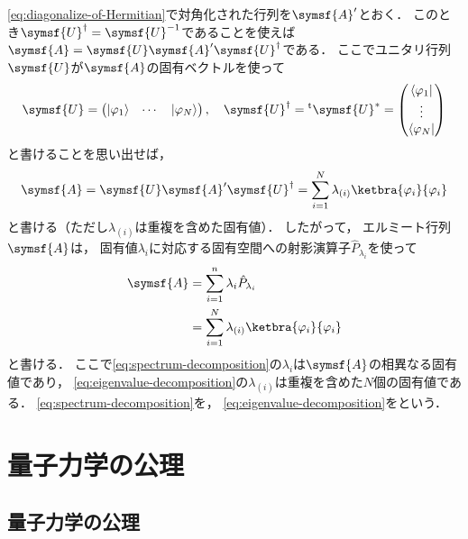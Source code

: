 \documentclass[
]{sotsu}
\begin{document}
\cref{eq:diagonalize-of-Hermitian}で対角化された行列を$\symsf{A}'$とおく．
このとき$\adjoint{\symsf{U}} = \symsf{U}^{-1}$であることを使えば\(
    \symsf{A} = \symsf{U} \symsf{A}' \adjoint{\symsf{U}}
\)である．
ここでユニタリ行列$\symsf{U}$が$\symsf{A}$の固有ベクトルを使って
\begin{equation*}
    \symsf{U} = 
    \begin{pmatrix}
        \ket{\varphi_1} & \cdots & \ket{\varphi_N}
    \end{pmatrix}
    ,
    \quad 
    \adjoint{\symsf{U}}
    = \tp{\conj{\symsf{U}}}
    = 
    \begin{pmatrix}
        \bra{\varphi_1} \\ \vdots \\ \bra{\varphi_N}
    \end{pmatrix}
\end{equation*}
と書けることを思い出せば，
\begin{equation*}
    \symsf{A}
    = \symsf{U} \symsf{A}' \adjoint{\symsf{U}}
    = \sum_{i = 1}^{N} \lambda_{(i)} \ketbra{\varphi_i}{\varphi_i}
\end{equation*}
と書ける（ただし$\lambda_{(i)}$は重複を含めた固有値）．
したがって，
エルミート行列$\symsf{A}$は，
固有値$\lambda_i$に対応する固有空間への射影演算子$\hat{P}_{\lambda_i}$を使って
\begin{subequations}
    \begin{align}
        \label{eq:spectrum-decomposition}
        \symsf{A} &= \sum_{i = 1}^{n} \lambda_i \hat{P}_{\lambda_i}
        \\
        \label{eq:eigenvalue-decomposition}
                  &= \sum_{i = 1}^{N} \lambda_{(i)} \ketbra{\varphi_i}{\varphi_i}
    \end{align}
\end{subequations}
と書ける．
ここで\cref{eq:spectrum-decomposition}の$\lambda_i$は$\symsf{A}$の相異なる固有値であり，
\cref{eq:eigenvalue-decomposition}の$\lambda_{(i)}$は重複を含めた$N$個の固有値である．
\cref{eq:spectrum-decomposition}を，
\cref{eq:eigenvalue-decomposition}をという．



\section{量子力学の公理}

\subsection{量子力学の公理}
\end{document}
